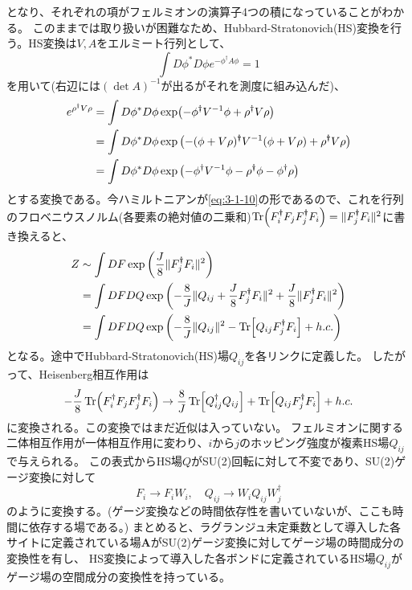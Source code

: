 \documentclass[11pt, aps, longbibliography]{article}
\begin{document}
        となり、それぞれの項がフェルミオンの演算子4つの積になっていることがわかる。
        このままでは取り扱いが困難なため、Hubbard-Stratonovich(HS)変換を行う。HS変換は$V,A$をエルミート行列として、
        \begin{equation}\label{eq:3-1-12}
            \int D\phi^*D\phi e^{-\phi^\dagger A \phi} = 1
        \end{equation}
        を用いて(右辺には$(\det A)^{-1}$が出るがそれを測度に組み込んだ)、
        \begin{align}\label{eq:3-1-13}
            e^{\rho^\dagger V \rho} &= \int D\phi^*D\phi \exp(-\phi^\dagger V^{-1}\phi + \rho^\dagger V \rho) \notag \\
            &= \int D\phi^*D\phi \exp\left(-(\phi+V\rho)^\dagger V^{-1}(\phi+V\rho) + \rho^\dagger V \rho \right) \notag \\
            &= \int D\phi^*D\phi \exp\left(-\phi^\dagger V^{-1}\phi - \rho^\dagger \phi - \phi^\dagger \rho \right)
        \end{align}
        とする変換である。今ハミルトニアンが\eqref{eq:3-1-10}の形であるので、これを行列のフロベニウスノルム(各要素の絶対値の二乗和)$\Tr (F_i^\dagger F_j F_j^\dagger F_i) = \| F_j^\dagger F_i \|^2$に書き換えると、
        \begin{align}\label{eq:3-1-14}
            Z &\sim \int DF \exp \left( \frac{J}{8}\| F_j^\dagger F_i \|^2 \right) \notag \\
            &= \int DFDQ \exp \left( -\frac{8}{J}\|Q_{ij} + \frac{J}{8}F_j^\dagger F_i \|^2 + \frac{J}{8}\| F_j^\dagger F_i \|^2  \right) \notag \\
            &= \int DFDQ \exp \left( -\frac{8}{J}\|Q_{ij}\|^2 - \Tr [Q_{ij} F_j^\dagger F_i ] + h.c. \right) 
        \end{align}
        となる。途中でHubbard-Stratonovich(HS)場$Q_{ij}$を各リンクに定義した。
        したがって、Heisenberg相互作用は
        \begin{equation}\label{eq:3-1-11}
            -\frac{J}{8}\Tr (F_i^\dagger F_j F_j^\dagger F_i) \rightarrow  \frac{8}{J}\Tr [Q_{ij}^\dagger Q_{ij}] +  \Tr[Q_{ij}F_{j}^\dagger F_i] + h.c.
        \end{equation}
        に変換される。この変換ではまだ近似は入っていない。
        フェルミオンに関する二体相互作用が一体相互作用に変わり、$i$から$j$のホッピング強度が複素HS場$Q_{ij}$で与えられる。
        この表式からHS場$Q$がSU(2)回転に対して不変であり、SU(2)ゲージ変換に対して
        \begin{equation}\label{eq:3-1-15}
            F_i \rightarrow F_iW_i, \quad Q_{ij} \rightarrow W_iQ_{ij}W_j^\dagger
        \end{equation}
        のように変換する。(ゲージ変換などの時間依存性を書いていないが、ここも時間に依存する場である。)
        まとめると、ラグランジュ未定乗数として導入した各サイトに定義されている場$\boldsymbol{A}$がSU(2)ゲージ変換に対してゲージ場の時間成分の変換性を有し、
        HS変換によって導入した各ボンドに定義されているHS場$Q_{ij}$がゲージ場の空間成分の変換性を持っている。
\end{document}
